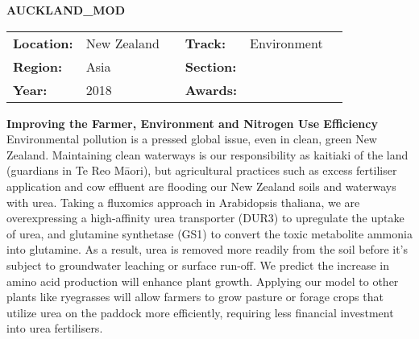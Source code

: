 \textbf{\uppercase{Auckland\_MOD}}
\FloatBarrier
\begin{table}[h]
\begin{tabular}{lp{2.5cm}llll}
\textbf{Location:} & New Zealand & \multicolumn{1}{|l}{} & \textbf{Track:}   & Environment \\
\textbf{Region:}   & Asia   & \multicolumn{1}{|l}{} & \textbf{Section:} &  \\
\textbf{Year:}     & 2018   & \multicolumn{1}{|l}{} & \textbf{Awards:}  &
\end{tabular}
\end{table}
\FloatBarrier
\noindent	\textbf{Improving the Farmer, Environment and Nitrogen Use Efficiency} \vspace{.2cm}\\
Environmental pollution is a pressed global issue, even in clean, green New Zealand. Maintaining clean waterways is our responsibility as kaitiaki of the land (guardians in Te Reo Māori), but agricultural practices such as excess fertiliser application and cow effluent are flooding our New Zealand soils and waterways with urea. Taking a fluxomics approach in Arabidopsis thaliana, we are overexpressing a high-affinity urea transporter (DUR3) to upregulate the uptake of urea, and glutamine synthetase (GS1) to convert the toxic metabolite ammonia into glutamine. As a result, urea is removed more readily from the soil before it’s subject to groundwater leaching or surface run-off. We predict the increase in amino acid production will enhance plant growth. Applying our model to other plants like ryegrasses will allow farmers to grow pasture or forage crops that utilize urea on the paddock more efficiently, requiring less financial investment into urea fertilisers. 
\vspace{2cm} $ $
\pagebreak

